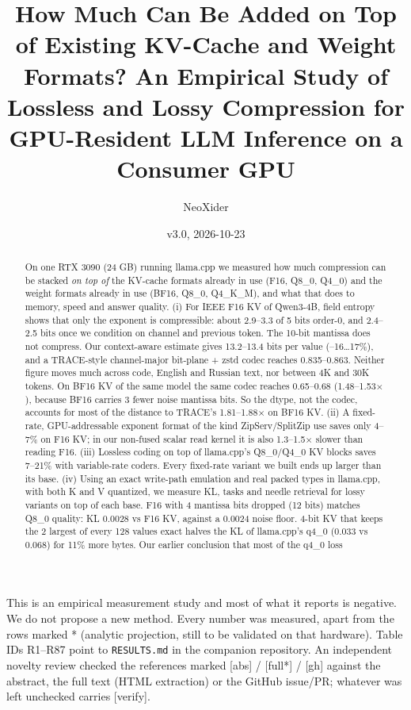 \documentclass[10pt]{article}
\title{How Much Can Be Added on Top of Existing KV-Cache and Weight Formats? An Empirical Study of Lossless and Lossy Compression for GPU-Resident LLM Inference on a Consumer GPU}
\author{NeoXider}
\date{v3.0, 2026-10-23}
\begin{document}
\maketitle


This is an empirical measurement study and most of what it reports is negative. We do not propose a new
method. Every number was measured, apart from the rows marked * (analytic projection, still to be validated
on that hardware). Table IDs R1--R87 point to \texttt{RESULTS.md} in the companion repository. An independent
novelty review checked the references marked [abs] / [full*] / [gh] against the abstract, the full text
(HTML extraction) or the GitHub issue/PR; whatever was left unchecked carries [verify].

\begin{abstract}
On one RTX 3090 (24 GB) running llama.cpp we measured how much compression can be stacked \emph{on top of}
the KV-cache formats already in use (F16, Q8\_0, Q4\_0) and the weight formats already in use (BF16, Q8\_0,
Q4\_K\_M), and what that does to memory, speed and answer quality. (i) For IEEE F16 KV of Qwen3-4B, field
entropy shows that only the exponent is compressible: about 2.9--3.3 of 5 bits order-0, and 2.4--2.5 bits
once we condition on channel and previous token. The 10-bit mantissa does not compress. Our context-aware
estimate gives 13.2--13.4 bits per value (--16\ldots{}17\%), and a TRACE-style channel-major bit-plane + zstd codec
reaches 0.835--0.863. Neither figure moves much across code, English and Russian text, nor between 4K and
30K tokens. On BF16 KV of the same model the same codec reaches 0.65--0.68 (1.48--1.53$\times$), because BF16
carries 3 fewer noise mantissa bits. So the dtype, not the codec, accounts for most of the distance to
TRACE's 1.81--1.88$\times$ on BF16 KV.
(ii) A fixed-rate, GPU-addressable exponent format of the kind ZipServ/SplitZip use saves only 4--7\% on F16
KV; in our non-fused scalar read kernel it is also 1.3--1.5$\times$ slower than reading F16. (iii) Lossless coding
on top of llama.cpp's Q8\_0/Q4\_0 KV blocks saves 7--21\% with variable-rate coders. Every fixed-rate variant
we built ends up larger than its base. (iv) Using an exact write-path emulation and real packed types in
llama.cpp, with both K and V quantized, we measure KL, tasks and needle retrieval for lossy variants on top
of each base. F16 with 4 mantissa bits dropped (12 bits) matches Q8\_0 quality: KL 0.0028 vs F16 KV, against
a 0.0024 noise floor. 4-bit KV that keeps the 2 largest of every 128 values exact halves the KL of
llama.cpp's q4\_0 (0.033 vs 0.068) for 11\% more bytes. Our earlier conclusion that most of the q4\_0 loss

\end{abstract}
\end{document}
